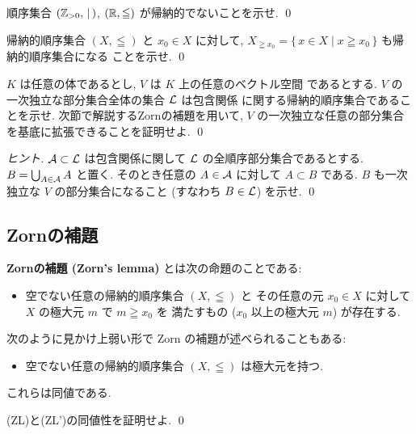 \documentclass[12pt,twoside]{jarticle}
\begin{document}
\begin{question}[5点]
  順序集合 $({\mathbb Z}_{>0},\,\mid\,)$, $({\mathbb R}, \leqq)$ が帰納的でないことを示せ.
  \qed
\end{question}

\begin{question}[5点]
  \label{q:indord-subset}
  帰納的順序集合 $(X,\leqq)$ と $x_0\in X$ に対して, %
  $X_{\geqq x_0} = \{\,x\in X \mid x \geqq x_0 \,\}$ も帰納的順序集合になる
  ことを示せ. 
  \qed
\end{question}

\begin{question}[10点, 任意のベクトル空間の基底の存在定理]
  \label{q:existence-basis-1}
  $K$ は任意の体であるとし, $V$ は $K$ 上の任意のベクトル空間
  であるとする. $V$ の一次独立な部分集合全体の集合 ${\mathcal L}$ は包含関係
  に関する帰納的順序集合であることを示せ.
  次節で解説するZornの補題を用いて, 
  $V$ の一次独立な任意の部分集合を基底に拡張できることを証明せよ.
  \qed
\end{question}

\begin{proof}[ヒント]
  ${\mathcal A}\subset {\mathcal L}$ は包含関係に関して ${\mathcal L}$ の全順序部分集合であるとする.
  $B=\bigcup_{A\in{\mathcal A}} A$ と置く.
  そのとき任意の $A\in{\mathcal A}$ に対して $A\subset B$ である.
  $B$ も一次独立な $V$ の部分集合になること (すなわち $B\in{\mathcal L}$) を示せ. 
  \qed
\end{proof}


\subsection{Zornの補題}

{\bf Zornの補題 (Zorn's lemma)} とは次の命題のことである:
\begin{itemize}
\item[(ZL)] 空でない任意の帰納的順序集合 $(X,\leqq)$ と
  その任意の元 $x_0\in X$ に対して $X$ の極大元 $m$ で $m\geqq x_0$ を
  満たすもの ($x_0$ 以上の極大元 $m$) が存在する.
\end{itemize}
次のように見かけ上弱い形で Zorn の補題が述べられることもある:
\begin{itemize}
\item[(ZL')] 空でない任意の帰納的順序集合 $(X,\leqq)$ は極大元を持つ.
\end{itemize}
これらは同値である.

\begin{question}[5点]
  (ZL)と(ZL')の同値性を証明せよ. \qed
\end{question}
\end{document}
